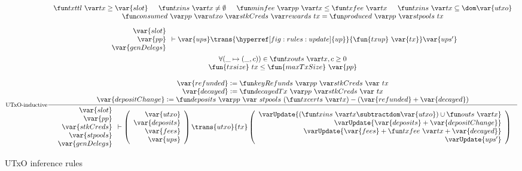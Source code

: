 \begin{figure}[htb]
  \begin{equation}\label{eq:utxo-inductive-shelley}
    \inference[UTxO-inductive]
    { \txttl tx \geq \var{slot}
      & \txins{tx} \neq \emptyset
      & \minfee{pp}{tx} \leq \txfee{tx}
      & \txins{tx} \subseteq \dom \var{utxo}
      \\
      \consumed{pp}{utxo}{stkCreds}{rewards}~{tx} = \produced{pp}{stpools}~{tx}
      \\
      ~
      \\
      {
        \begin{array}{r}
          \var{slot} \\
          \var{pp} \\
          \var{genDelegs} \\
        \end{array}
      }
      \vdash \var{ups} \trans{\hyperref[fig:rules:update]{up}}{\fun{txup}~\var{tx}} \var{ups'}
      \\
      ~
      \\
      \forall (\_\mapsto (\_, c)) \in \txouts{tx}, c \geq 0
      \\
      \fun{txsize}~{tx}\leq\fun{maxTxSize}~\var{pp}
      \\
      ~
      \\
      \var{refunded} \leteq \keyRefunds{pp}{stkCreds}~{tx}
      \\
      \var{decayed} \leteq \decayedTx{pp}{stkCreds}~{tx}
      \\
      \var{depositChange} \leteq
        \deposits{pp}~{stpools}~{(\txcerts{tx})} - (\var{refunded} + \var{decayed})
    }
    {
      \begin{array}{r}
        \var{slot}\\
        \var{pp}\\
        \var{stkCreds}\\
        \var{stpools}\\
        \var{genDelegs}\\
      \end{array}
      \vdash
      \left(
      \begin{array}{r}
        \var{utxo} \\
        \var{deposits} \\
        \var{fees} \\
        \var{ups}\\
      \end{array}
      \right)
      \trans{utxo}{tx}
      \left(
      \begin{array}{r}
        \varUpdate{(\txins{tx} \subtractdom \var{utxo}) \cup \outs{tx}}  \\
        \varUpdate{\var{deposits} + \var{depositChange}} \\
        \varUpdate{\var{fees} + \txfee{tx} + \var{decayed}} \\
        \varUpdate{ups'}\\
      \end{array}
      \right)
    }
  \end{equation}
  \caption{UTxO inference rules}
  \label{fig:rules:utxo-shelley}
\end{figure}

